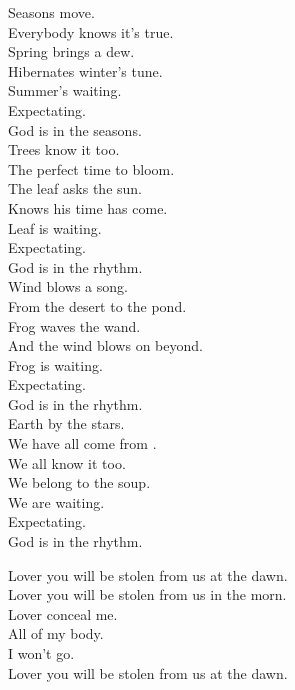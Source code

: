 Seasons move. \\
Everybody knows it's true. \\
Spring brings a dew. \\
Hibernates winter's tune. \\

Summer's waiting. \\
Expectating. \\
God is in the seasons. \\

Trees know it too. \\
The perfect time to bloom. \\
The leaf asks the sun. \\
Knows his time has come. \\

Leaf is waiting. \\
Expectating. \\
God is in the rhythm. \\

Wind blows a song. \\
From the desert to the pond. \\
Frog waves the wand. \\
And the wind blows on beyond. \\

Frog is waiting. \\
Expectating. \\
God is in the rhythm. \\

Earth by the stars. \\
We have all come from . \\
We all know it too. \\
We belong to the soup. \\

We are waiting. \\
Expectating. \\
God is in the rhythm. \\




Lover you will be stolen from us at the dawn. \\
Lover you will be stolen from us in the morn. \\
Lover conceal me. \\
All of my body. \\
I won't go. \\
Lover you will be stolen from us at the dawn. \\

